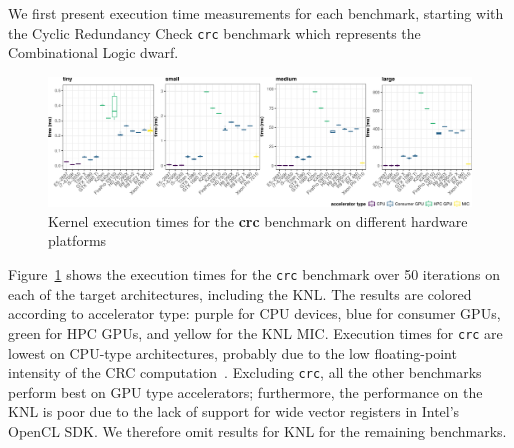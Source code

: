 \documentclass[../document.tex]{subfiles}
\begin{document}
\label{ssec:time}
	
We first present execution time measurements for each benchmark, starting with the Cyclic Redundancy Check {\tt crc} benchmark which represents the Combinational Logic dwarf.

\newcommand{\plotwidth}{0.24\textwidth}

\begin{figure}[t]
	\centering
	\includegraphics[width=\textwidth,keepaspectratio]{figures/new-time-results/generate_crc_row_bandwplot}
	\caption{Kernel execution times for the {\bf crc} benchmark on different hardware platforms}
	\label{fig:time-crc}
\end{figure}


Figure~\ref{fig:time-crc} shows the execution times for the {\tt crc} benchmark over 50 iterations on each of the target architectures, including the KNL.
The results are colored according to accelerator type: purple for CPU devices, blue for consumer GPUs, green for HPC GPUs, and yellow for the KNL MIC.
Execution times for {\tt crc} are lowest on CPU-type architectures, probably due to the low floating-point intensity of the CRC computation~\cite[Ch. 6]{joshi2016thesis}.
Excluding {\tt crc}, all the other benchmarks perform best on GPU type accelerators; furthermore, the performance on the KNL is poor due to the lack of support for wide vector registers in Intel's OpenCL SDK.
We therefore omit results for KNL for the remaining benchmarks.
\end{document}
